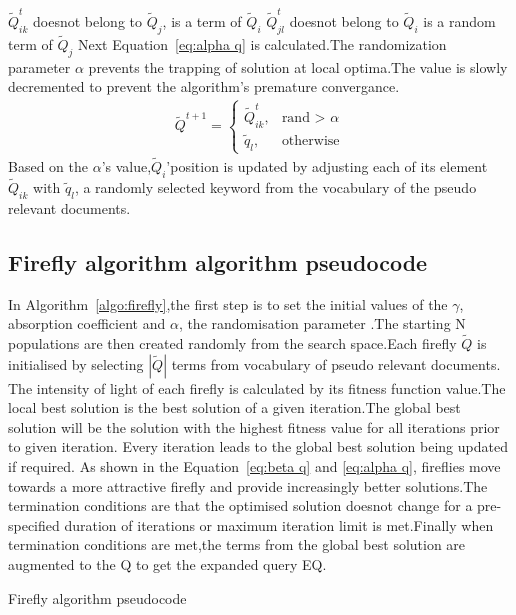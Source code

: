 \documentclass{nitk}
\begin{document}
$\tilde{Q}_{ik}^t$ doesnot belong to $\tilde{Q}_{j}$, is a term of $\tilde{Q}_i$
\newline
$\tilde{Q}_{jl}^t$ doesnot belong to $\tilde{Q}_i$ is a random term of $\tilde{Q}_{j}$
\newline
\newline
Next Equation~\ref{eq:alpha q} is calculated.The randomization parameter $\alpha$ prevents the trapping of solution at local optima.The value is slowly decremented to prevent the algorithm's premature convergance.
\begin{equation}
\label{eq:alpha q}
\begin{aligned}
    \tilde{Q}^{t+1}= 
    \begin{cases}
    \tilde{Q}_{ik}^t, &\text{rand > } \alpha \\
    \tilde{q}_l, &\text{otherwise}    
    \end{cases}    
\end{aligned}
\end{equation}
Based on the $\alpha$'s value,$\tilde{Q}_i$'position is updated by adjusting each of its element $\tilde{Q}_{ik}$ with $\tilde{q}_l$, a randomly selected keyword from the vocabulary of the pseudo relevant documents.
\subsection{Firefly algorithm algorithm pseudocode}
In Algorithm~\ref{algo:firefly},the first step is to set the initial values of the $\gamma$, absorption coefficient and $\alpha$, the randomisation parameter .The starting N populations are then created randomly from the search space.Each firefly $\tilde{Q}$ is initialised by selecting $|\tilde{Q}|$ terms from vocabulary of pseudo relevant documents. The intensity of light of each firefly is calculated by its fitness function value.The local best solution is the best solution of a given iteration.The global best solution will be the solution with the highest fitness value for all iterations prior to given iteration. Every iteration leads to the global best solution being updated if required. As shown in the Equation~\ref{eq:beta q} and \ref{eq:alpha q}, fireflies move towards a more attractive firefly and provide increasingly better solutions.The termination conditions are that the optimised solution doesnot change for a pre-specified duration of iterations or maximum iteration limit is met.Finally when termination conditions are met,the terms from the global best solution are augmented to the Q to get the expanded query EQ. 
 \begin{algorithm}
 \caption{Firefly algorithm pseudocode}
 \label{algo:firefly}
 
 \end{algorithm}
\newpage
\end{document}
